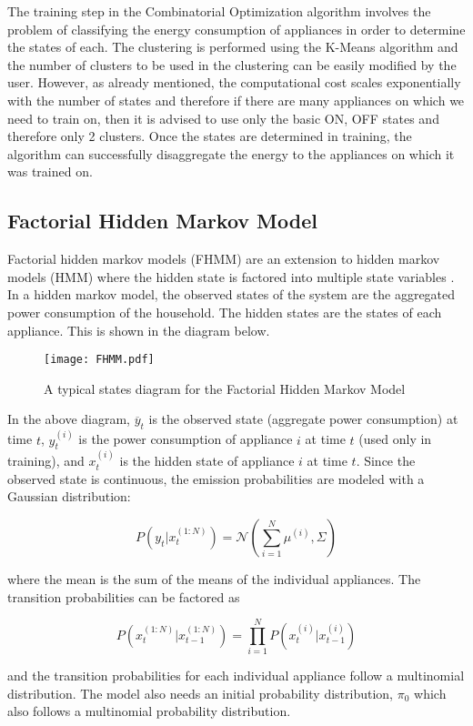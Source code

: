 \documentclass[10pt]{article}
\begin{document}
The training step in the Combinatorial Optimization algorithm involves the problem of classifying the energy consumption of appliances in order to determine the states of each. The clustering is performed using the K-Means algorithm and the number of clusters to be used in the clustering can be easily modified by the user. However, as already mentioned, the computational cost scales exponentially with the number of states and therefore if there are many appliances on which we need to train on, then it is advised to use only the basic ON, OFF states and therefore only 2 clusters. Once the states are determined in training, the algorithm can successfully disaggregate the energy to the appliances on which it was trained on.
\subsection{Factorial Hidden Markov Model}
Factorial hidden markov models (FHMM) are an extension to hidden markov models (HMM) where the hidden state is factored into multiple state variables \cite{Ghahraani}. In a hidden markov model, the observed states of the system are the aggregated power consumption of the household. The hidden states are the states of each appliance. This is shown in the diagram below.

\begin{figure}[!ht]
  \centering
\texttt{[image: FHMM.pdf]}
  \caption{A typical states diagram for the Factorial Hidden Markov Model \cite{REDD}}\label{fig:HFMM}
\end{figure}

In the above diagram, $\overline{y}_t$ is the observed state (aggregate power consumption) at time $t$, $y_t^{(i)}$ is the power consumption of appliance $i$ at time $t$ (used only in training), and $x_t^{(i)}$ is the hidden state of appliance $i$ at time $t$. Since the observed state is continuous, the emission probabilities are modeled with a Gaussian distribution:

\[P(y_t|x_t^{(1:N)}) = \mathcal{N} \left(\sum_{i=1}^N \mu^{(i)}, \Sigma \right) \]

where the mean is the sum of the means of the individual appliances. The transition probabilities can be factored as

\[P(x_t^{(1:N)}|x_{t-1}^{(1:N)}) = \prod_{i=1}^{N} P(x_t^{(i)}|x_{t-1}^{(i)})\]

and the transition probabilities for each individual appliance follow a multinomial distribution. The model also needs an initial probability distribution, $\pi_0$ which also follows a multinomial probability distribution.
\end{document}
